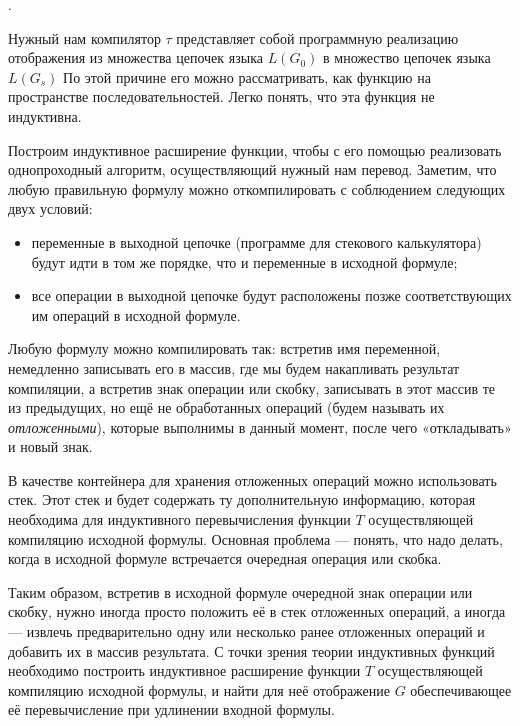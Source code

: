 .

Нужный нам компилятор $\tau$ представляет собой программную реализацию отображения из
множества цепочек языка $L(G_0)$ в множество цепочек языка $L(G_s)$ По этой причине его можно
рассматривать, как функцию на пространстве последовательностей. Легко понять,
что эта функция не индуктивна.

Построим индуктивное расширение функции, чтобы с его помощью реализовать однопроходный алгоритм, осуществляющий нужный нам перевод. Заметим, что любую
правильную формулу можно откомпилировать с соблюдением следующих двух условий:
\begin{itemize}
\item переменные в выходной цепочке (программе для стекового калькулятора) будут идти
в том же порядке, что и переменные в исходной формуле;
\item все операции в выходной цепочке будут расположены позже соответствующих им
операций в исходной формуле.
\end{itemize}

Любую формулу можно компилировать так: встретив имя переменной, немедленно
записывать его в массив, где мы будем накапливать результат компиляции, а
встретив знак операции или скобку, записывать в этот массив те из предыдущих,
но ещё не обработанных операций (будем называть их \emph{отложенными}), которые
выполнимы в данный момент, после чего «откладывать» и новый знак.

В качестве контейнера для хранения отложенных операций можно использовать стек.
Этот стек и будет содержать ту дополнительную информацию, которая необходима для
индуктивного перевычисления функции $T$ осуществляющей компиляцию исходной формулы.
Основная проблема — понять, что надо делать, когда в исходной формуле встречается
очередная операция или скобка.

Таким образом, встретив в исходной формуле очередной знак операции или скобку,
нужно иногда просто положить её в стек отложенных операций, а иногда — извлечь
предварительно одну или несколько ранее отложенных операций и добавить их в
массив результата. С точки зрения теории индуктивных функций необходимо построить
индуктивное расширение функции $T$ осуществляющей компиляцию исходной формулы, и
найти для неё отображение $G$ обеспечивающее её перевычисление при удлинении входной формулы.

